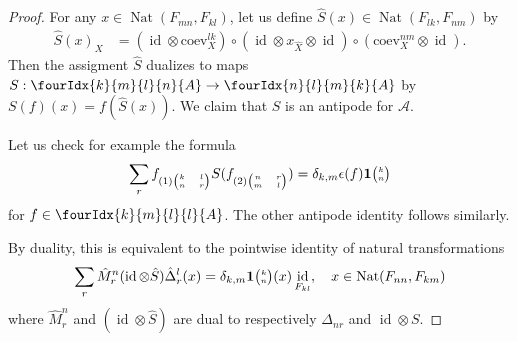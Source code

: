 \documentclass[10pt]{article}
\DeclareMathOperator{\id}{id}
\DeclareMathOperator{\Nat}{\mathrm{Nat}}
\newcommand{\n}{\mathfrak{n}}
\newcommand{\ev}{\mathrm{ev}}
\newcommand{\coev}{\mathrm{coev}}
\newcommand{\Grt}[3]{#1{\tiny {\begin{pmatrix} #2\\#3\end{pmatrix}}}}
\newcommand{\UnitC}[2]{\Grt{\mathbf{1}}{#1}{#2}}
\newcommand{\Gr}[5]{\fourIdx{#2}{#4}{#3}{#5}{#1}}%
\theoremstyle{definition}
\numberwithin{equation}{section}
\begin{document}
\begin{proof} 
  For any $x\in \Nat(F_{mn},F_{kl})$, let us define $\hat{S}(x) \in
  \Nat(F_{lk},F_{nm})$ by
\begin{align*}
  \hat{S}(x)_X &= %
(\id \otimes \coev^{lk}_{X}) \circ (\id \otimes x_{\hat X}
  \otimes \id) \circ (\coev^{nm}_{X} \otimes \id).
\end{align*}
Then the assigment $\hat{S}$ dualizes to maps $S:\Gr{A}{k}{l}{m}{n} \rightarrow \Gr{A}{n}{m}{l}{k}$ by $S(f)(x) = f(\hat{S}(x))$. We claim that $S$ is an antipode for $\mathscr{A}$. 

Let us check for example the formula \[\sum_r f_{(1){\tiny \begin{pmatrix}k&l\\n & r\end{pmatrix}}} S(f_{(2){\tiny \begin{pmatrix} n & r \\ m & l\end{pmatrix}}}) = \delta_{k,m}\epsilon(f)\UnitC{k}{n}\] for $f\in \Gr{A}{k}{l}{m}{l}$. The other antipode identity follows similarly.

By duality, this is equivalent to the pointwise identity of natural transformations \[\sum_r\hat{M}^n_r(\id\otimes \hat{S})\hat{\Delta}^l_r(x) = \delta_{k,m}\UnitC{k}{n}(x) \id_{F_{kl}},\quad x\in \Nat(F_{nn},F_{km})\] where $\hat{M}^n_r$ and $(\id\otimes \hat{S})$ are dual to respectively $\Delta_{nr}$ and $\id\otimes S$. 


\end{proof}
\end{document}
